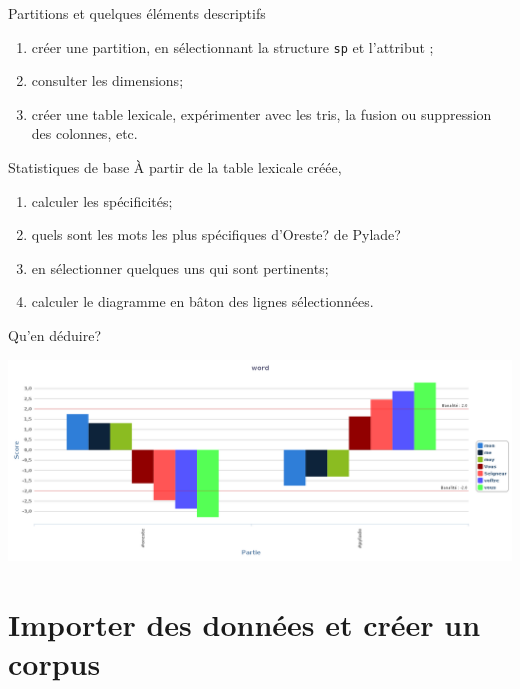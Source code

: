 \documentclass{beamer}
\begin{document}
\begin{frame}{Partitions et quelques éléments descriptifs}
\begin{enumerate}
\item créer une partition, en sélectionnant la structure \texttt{sp} et l'attribut \texttt{\@who};
\item consulter les dimensions;
\item créer une table lexicale, expérimenter avec les tris, la fusion ou suppression des colonnes, etc.
\end{enumerate}
\end{frame}

\begin{frame}{Statistiques de base}
À partir de la table lexicale créée,
\begin{enumerate}
\item calculer les spécificités;
\item quels sont les mots les plus spécifiques d'Oreste? de Pylade?
\item en sélectionner quelques uns qui sont pertinents;
\item calculer le diagramme en bâton des lignes sélectionnées.
\end{enumerate}
\end{frame}

\begin{frame}{Qu'en déduire?}
	
	\includegraphics[width=\textwidth]{img/graphique_word_Oreste.png}
	
\end{frame}




\section{Importer des données et créer un corpus}
\end{document}
